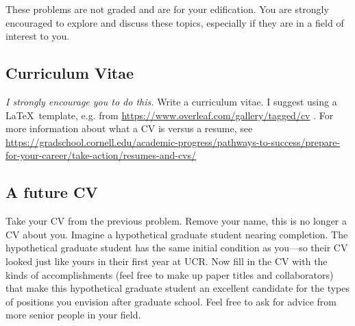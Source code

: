 \documentclass[12pt]{article}
\numberwithin{equation}{subsection}    %
\begin{document}
These problems are not graded and are for your edification. You are strongly encouraged to explore and discuss these topics, especially if they are in a field of interest to you.


\subsection*{Curriculum Vitae}
\emph{I strongly encourage you to do this.} Write a curriculum vitae. I suggest using a \LaTeX\, template, e.g. from \url{https://www.overleaf.com/gallery/tagged/cv} . For more information about what a CV is versus a resume, see \url{https://gradschool.cornell.edu/academic-progress/pathways-to-success/prepare-for-your-career/take-action/resumes-and-cvs/}


\subsection*{A future CV}

Take your CV from the previous problem. Remove your name, this is no longer a CV about you. Imagine a hypothetical graduate student nearing completion. The hypothetical graduate student has the same initial condition as you---so their CV looked just like yours in their first year at UCR. Now fill in the CV with the kinds of accomplishments (feel free to make up paper titles and collaborators) that make this hypothetical graduate student an excellent candidate for the types of positions you envision after graduate school. Feel free to ask for advice from more senior people in your field.
\end{document}
